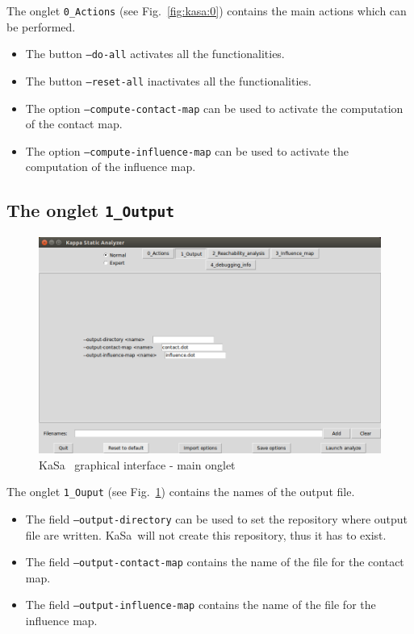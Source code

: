 \documentclass[11pt]{book}
\def\KaSa{\textsf{KaSa}}
\begin{document}
The onglet \texttt{0\_Actions} (see Fig.~\ref{fig:kasa:0}) contains the main actions which can be performed. 

\begin{itemize}
\item The button \texttt{--do-all} activates all the functionalities. 
\item The button \texttt{--reset-all} inactivates all the functionalities.
\item The option \texttt{--compute-contact-map} can be used to activate the computation of the contact map. 
\item The option \texttt{--compute-influence-map} can be used to activate the computation of the influence map.
\end{itemize}

\subsection{The onglet \texttt{1\_Output}}

\begin{figure}[htbp]
\centering
\includegraphics[width=12cm,natwidth=920pt,natheight=582pt]{img/kasa_1.png}
\caption{\KaSa~ graphical interface - main onglet}
\label{fig:kasa:1}
\end{figure}


The onglet \texttt{1\_Ouput} (see Fig.~\ref{fig:kasa:1}) contains the names of the output file. 

\begin{itemize}
\item The field \texttt{--output-directory} can be used to set the repository where output file are written. \KaSa~will not create this repository, thus it has to exist. 
\item The field \texttt{--output-contact-map} contains the name of the file for the contact map. 
\item The field \texttt{--output-influence-map} contains the name of the file for the influence map. 
\end{itemize}
\end{document}
